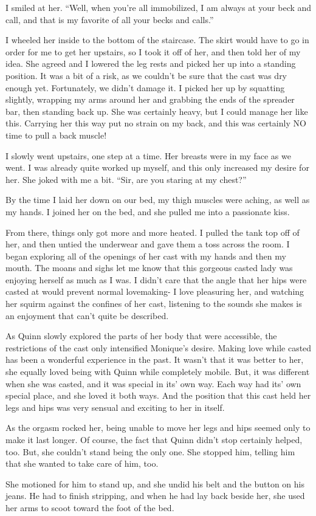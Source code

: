I smiled at her. ``Well, when you're all immobilized, I am always at your beck and call, and
that is my favorite of all your becks and calls.''

I wheeled her inside to the bottom of the staircase. The skirt would have to go in order
for me to get her upstairs, so I took it off of her, and then told her of my idea. She agreed
and I lowered the leg rests and picked her up into a standing position. It was a bit of a risk,
as we couldn't be sure that the cast was dry enough yet. Fortunately, we didn't damage it. I
picked her up by squatting slightly, wrapping my arms around her and grabbing the ends of the
spreader bar, then standing back up. She was certainly heavy, but I could manage her like this.
Carrying her this way put no strain on my back, and this was certainly NO time to pull a back
muscle!

I slowly went upstairs, one step at a time. Her breasts were in my face as we went. I was
already quite worked up myself, and this only increased my desire for her. She joked with me a
bit. ``Sir, are you staring at my chest?''

By the time I laid her down on our bed, my thigh muscles were aching, as well as my hands.
I joined her on the bed, and she pulled me into a passionate kiss.

From there, things only got more and more heated. I pulled the tank top off of her, and
then untied the underwear and gave them a toss across the room. I began exploring all of the
openings of her cast with my hands and then my mouth. The moans and sighs let me know that this
gorgeous casted lady was enjoying herself as much as I was. I didn't care that the angle that
her hips were casted at would prevent normal lovemaking- I love pleasuring her, and watching her
squirm against the confines of her cast, listening to the sounds she makes is an enjoyment that
can't quite be described.

\begin{thought}
As Quinn slowly explored the parts of her body that were accessible, the restrictions of
the cast only intensified Monique's desire. Making love while casted has been a wonderful
experience in the past. It wasn't that it was better to her, she equally loved being with Quinn
while completely mobile. But, it was different when she was casted, and it was special in its'
own way. Each way had its' own special place, and she loved it both ways. And the position that
this cast held her legs and hips was very sensual and exciting to her in itself.

As the orgasm rocked her, being unable to move her legs and hips seemed only to make it
last longer. Of course, the fact that Quinn didn't stop certainly helped, too. But, she couldn't
stand being the only one. She stopped him, telling him that she wanted to take care of him, too.

She motioned for him to stand up, and she undid his belt and the button on his jeans. He
had to finish stripping, and when he had lay back beside her, she used her arms to scoot toward
the foot of the bed.
\end{thought}

